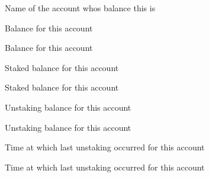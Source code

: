 Name of the account who\textquotesingle{}s balance this is

Balance for this account

Balance for this account

Staked balance for this account

Staked balance for this account

Unstaking balance for this account

Unstaking balance for this account

Time at which last unstaking occurred for this account

Time at which last unstaking occurred for this account